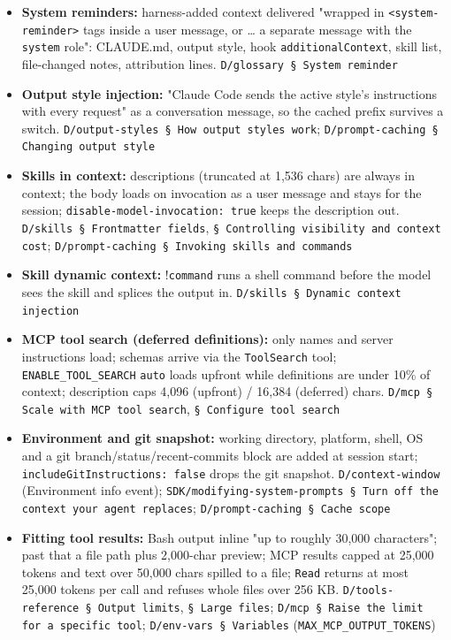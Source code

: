 \begin{itemize}
\item \textbf{System reminders:} harness-added context delivered "wrapped in \texttt{<system-\allowbreak{}reminder>} tags inside a user message, or \ldots{} a separate message with the \texttt{system} role": CLAUDE.md, output style, hook \texttt{additionalContext}, skill list, file-changed notes, attribution lines. \texttt{D/\allowbreak{}glossary § System reminder}
\item \textbf{Output style injection:} "Claude Code sends the active style's instructions with every request" as a conversation message, so the cached prefix survives a switch. \texttt{D/\allowbreak{}output-\allowbreak{}styles § How output styles work}; \texttt{D/\allowbreak{}prompt-\allowbreak{}caching § Changing output style}
\item \textbf{Skills in context:} descriptions (truncated at 1,536 chars) are always in context; the body loads on invocation as a user message and stays for the session; \texttt{disable-\allowbreak{}model-\allowbreak{}invocation:\allowbreak{} true} keeps the description out. \texttt{D/\allowbreak{}skills § Frontmatter fields}, \texttt{§ Controlling visibility and context cost}; \texttt{D/\allowbreak{}prompt-\allowbreak{}caching § Invoking skills and commands}
\item \textbf{Skill dynamic context:} \texttt{} !\texttt{command} \texttt{} runs a shell command before the model sees the skill and splices the output in. \texttt{D/\allowbreak{}skills § Dynamic context injection}
\item \textbf{MCP tool search (deferred definitions):} only names and server instructions load; schemas arrive via the \texttt{ToolSearch} tool; \texttt{ENABLE\_\allowbreak{}TOOL\_\allowbreak{}SEARCH} \texttt{auto} loads upfront while definitions are under 10\% of context; description caps 4,096 (upfront) / 16,384 (deferred) chars. \texttt{D/\allowbreak{}mcp § Scale with MCP tool search}, \texttt{§ Configure tool search}
\item \textbf{Environment and git snapshot:} working directory, platform, shell, OS and a git branch/status/recent-commits block are added at session start; \texttt{includeGitInstructions:\allowbreak{} false} drops the git snapshot. \texttt{D/\allowbreak{}context-\allowbreak{}window} (Environment info event); \texttt{SDK/\allowbreak{}modifying-\allowbreak{}system-\allowbreak{}prompts § Turn off the context your agent replaces}; \texttt{D/\allowbreak{}prompt-\allowbreak{}caching § Cache scope}
\item \textbf{Fitting tool results:} Bash output inline "up to roughly 30,000 characters"; past that a file path plus 2,000-char preview; MCP results capped at 25,000 tokens and text over 50,000 chars spilled to a file; \texttt{Read} returns at most 25,000 tokens per call and refuses whole files over 256 KB. \texttt{D/\allowbreak{}tools-\allowbreak{}reference § Output limits}, \texttt{§ Large files}; \texttt{D/\allowbreak{}mcp § Raise the limit for a specific tool}; \texttt{D/\allowbreak{}env-\allowbreak{}vars § Variables} (\texttt{MAX\_\allowbreak{}MCP\_\allowbreak{}OUTPUT\_\allowbreak{}TOKENS})

\end{itemize}
